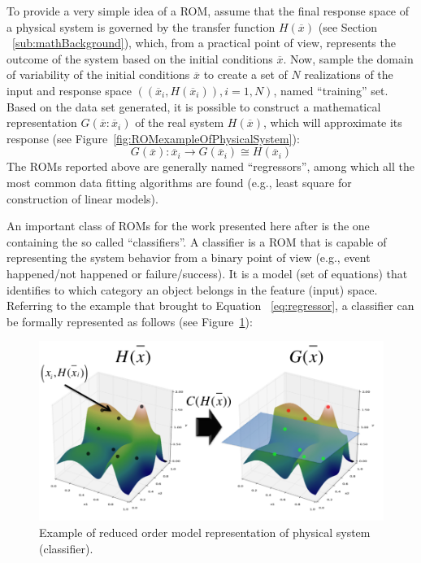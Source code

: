 To provide a very simple idea of a ROM, assume that the final 
response space of a physical system is governed by the transfer 
function $H \left (  \overline{x}\right)$ (see Section
~\ref{sub:mathBackground}), which, from a practical point of 
view, represents the outcome of the system based on the initial 
conditions  $\overline{x}$. Now, sample the domain of variability of the 
initial conditions $\overline{x}$ to create a 
set of $N$ realizations of the input and response space $ \left ( \left ( 
\overline{x}_{i}, H \left (  \overline{x}_{i}\right) \right), i=1,N \right)$, 
named ``training'' set. Based on the data set generated, it is possible 
to construct a mathematical representation $G\left ( \overline{x}:
\overline{x}_{i}\right)$ of the 
real system $H \left (  \overline{x}\right)$, which will approximate its 
response (see Figure~\ref{fig:ROMexampleOfPhysicalSystem}):
\begin{equation}
\label{eq:regressor}
G\left ( \overline{x} \right ):\overline{x}_{i} \rightarrow G\left ( \overline{x}_{i} \right ) \cong H\left ( \overline{x}_{i} \right )
\end{equation}
The ROMs reported above are generally named ``regressors'', among 
which all the most common data fitting algorithms are found (e.g., 
least square for construction of linear models).

An important class of ROMs for the work presented here after is the 
one containing the so called ``classifiers''. A classifier is a ROM that is 
capable of representing the system behavior from a binary point of 
view (e.g., event happened/not happened or failure/success). It is a 
model (set of equations) that identifies to which category an object 
belongs in the feature (input) space. Referring to the example that 
brought to Equation ~\ref{eq:regressor}, a classifier can be formally represented as follows (see 
Figure~\ref{fig:ROMClassifierExampleOfPhysicalSystem}):
\begin{figure}[h!]
  \centering
  \includegraphics[width=1.0\textwidth]  {pics/ROMClassifierExampleOfPhysicalSystem.png}
  \caption{Example of reduced order model representation of physical system (classifier).}
  \label{fig:ROMClassifierExampleOfPhysicalSystem}
\end{figure}

